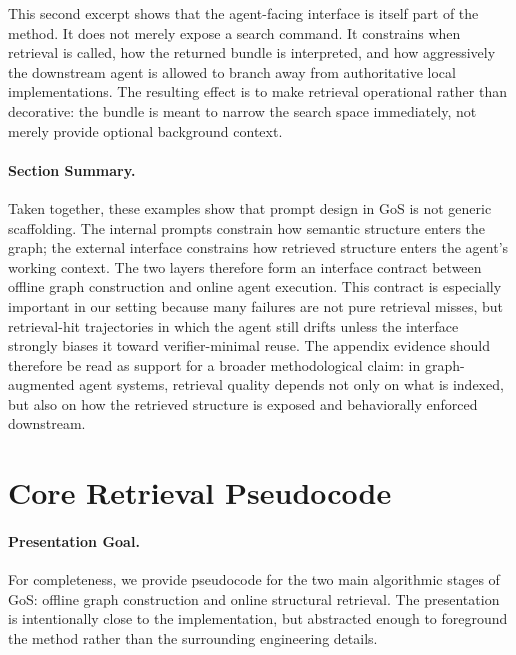 This second excerpt shows that the agent-facing interface is itself part of the method. It does not merely expose a search command. It constrains when retrieval is called, how the returned bundle is interpreted, and how aggressively the downstream agent is allowed to branch away from authoritative local implementations. The resulting effect is to make retrieval operational rather than decorative: the bundle is meant to narrow the search space immediately, not merely provide optional background context.

\paragraph{Section Summary.}
Taken together, these examples show that prompt design in GoS is not generic scaffolding. The internal prompts constrain how semantic structure enters the graph; the external interface constrains how retrieved structure enters the agent's working context. The two layers therefore form an interface contract between offline graph construction and online agent execution. This contract is especially important in our setting because many failures are not pure retrieval misses, but retrieval-hit trajectories in which the agent still drifts unless the interface strongly biases it toward verifier-minimal reuse. The appendix evidence should therefore be read as support for a broader methodological claim: in graph-augmented agent systems, retrieval quality depends not only on what is indexed, but also on how the retrieved structure is exposed and behaviorally enforced downstream.

\section{Core Retrieval Pseudocode}

\paragraph{Presentation Goal.}
For completeness, we provide pseudocode for the two main algorithmic stages of GoS: offline graph construction and online structural retrieval. The presentation is intentionally close to the implementation, but abstracted enough to foreground the method rather than the surrounding engineering details.

